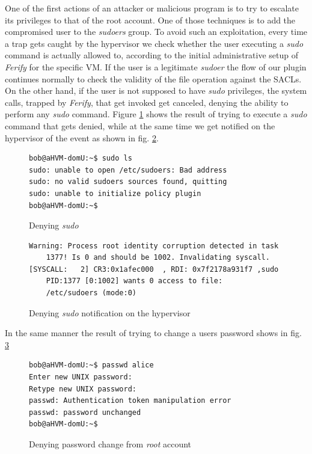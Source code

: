 \par One of the first actions of an attacker or malicious program is to try to escalate its privileges to that of the root account. One of those techniques is to add the compromised user to the \emph{sudoers} group. To avoid such an exploitation, every time a trap gets caught by the hypervisor we check whether the user executing a \emph{sudo} command is actually allowed to, according to the initial administrative setup of \emph{Ferify} for the specific \ac{VM}. If the user is a legitimate \emph{sudoer} the flow of our plugin continues normally to check the validity of the file operation against the \acp{SACL}. On the other hand, if the user is not supposed to have \emph{sudo} privileges, the system calls, trapped by \emph{Ferify}, that get invoked get canceled, denying the ability to perform any \emph{sudo} command. Figure \ref{fig:sudo_deny} shows the result of trying to execute a \emph{sudo} command that gets denied, while at the same time we get notified on the hypervisor of the event as shown in fig. \ref{fig:sudo_deny_not}.

\begin{figure}[ht]
	\centering
	\footnotesize{\selectfont 
		\begin{lstlisting}
bob@aHVM-domU:~$ sudo ls
sudo: unable to open /etc/sudoers: Bad address
sudo: no valid sudoers sources found, quitting
sudo: unable to initialize policy plugin
bob@aHVM-domU:~$
		\end{lstlisting}}
	\caption{Denying \emph{sudo}}
	\label{fig:sudo_deny}
\end{figure}

\begin{figure}[ht]
	\centering
	\footnotesize{\selectfont 
		\begin{lstlisting}
Warning: Process root identity corruption detected in task 
	1377! Is 0 and should be 1002. Invalidating syscall.
[SYSCALL:   2] CR3:0x1afec000  , RDI: 0x7f2178a931f7 ,sudo 
	PID:1377 [0:1002] wants 0 access to file: 
	/etc/sudoers (mode:0)
		\end{lstlisting}}
	\caption{Denying \emph{sudo} notification on the hypervisor}
	\label{fig:sudo_deny_not}
\end{figure}

\par In the same manner the result of trying to change a users password shows in fig. \ref{fig:passwd_deny}

\begin{figure}[ht]
	\centering
	\footnotesize{\selectfont 
		\begin{lstlisting}
bob@aHVM-domU:~$ passwd alice
Enter new UNIX password:
Retype new UNIX password:
passwd: Authentication token manipulation error
passwd: password unchanged
bob@aHVM-domU:~$
		\end{lstlisting}}
	\caption{Denying password change from \emph{root} account}
	\label{fig:passwd_deny}
\end{figure}


